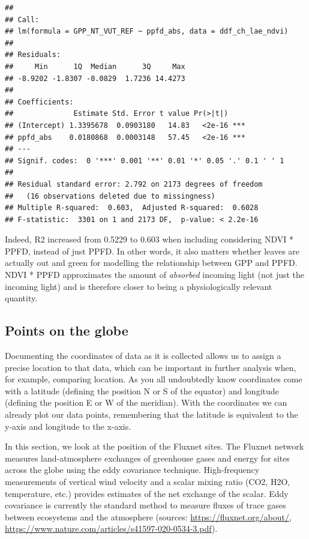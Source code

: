 \documentclass[
]{book}
\begin{document}
\begin{verbatim}
## 
## Call:
## lm(formula = GPP_NT_VUT_REF ~ ppfd_abs, data = ddf_ch_lae_ndvi)
## 
## Residuals:
##     Min      1Q  Median      3Q     Max 
## -8.9202 -1.8307 -0.0829  1.7236 14.4273 
## 
## Coefficients:
##              Estimate Std. Error t value Pr(>|t|)    
## (Intercept) 1.3395678  0.0903180   14.83   <2e-16 ***
## ppfd_abs    0.0180868  0.0003148   57.45   <2e-16 ***
## ---
## Signif. codes:  0 '***' 0.001 '**' 0.01 '*' 0.05 '.' 0.1 ' ' 1
## 
## Residual standard error: 2.792 on 2173 degrees of freedom
##   (16 observations deleted due to missingness)
## Multiple R-squared:  0.603,  Adjusted R-squared:  0.6028 
## F-statistic:  3301 on 1 and 2173 DF,  p-value: < 2.2e-16
\end{verbatim}

Indeed, R2 increased from 0.5229 to 0.603 when including considering NDVI * PPFD, instead of just PPFD. In other words, it also matters whether leaves are actually out and green for modelling the relationship between GPP and PPFD. NDVI * PPFD approximates the amount of \emph{absorbed} incoming light (not just the incoming light) and is therefore closer to being a physiologically relevant quantity.

\hypertarget{points-on-the-globe}{%
\subsection{Points on the globe}\label{points-on-the-globe}}

Documenting the coordinates of data as it is collected allows us to assign a precise location to that data, which can be important in further analysis when, for example, comparing location. As you all undoubtedly know coordinates come with a latitude (defining the position N or S of the equator) and longitude (defining the position E or W of the meridian). With the coordinates we can already plot our data points, remembering that the latitude is equivalent to the y-axis and longitude to the x-axis.

In this section, we look at the position of the Fluxnet sites. The Fluxnet network measures land-atmosphere exchanges of greenhouse gases and energy for sites across the globe using the eddy covariance technique. High-frequency measurements of vertical wind velocity and a scalar mixing ratio (CO2, H2O, temperature, etc.) provides estimates of the net exchange of the scalar. Eddy covariance is currently the standard method to measure fluxes of trace gases between ecosystems and the atmosphere (sources:
\url{https://fluxnet.org/about/}, \url{https://www.nature.com/articles/s41597-020-0534-3.pdf}).
\end{document}
